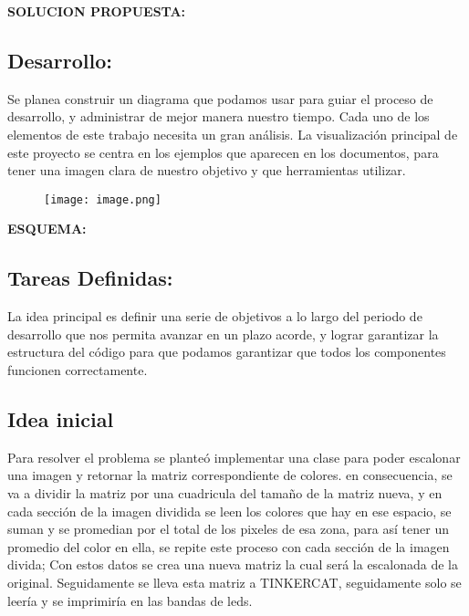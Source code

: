 \documentclass{article}
\begin{document}
\vspace{12cm}

\begin{center}
\Huge
\textbf{SOLUCION PROPUESTA: }
\end{center}
\subsection{Desarrollo:}
Se planea construir un diagrama que podamos usar para guiar el proceso de desarrollo, y administrar de mejor manera nuestro tiempo. Cada uno de los elementos de este trabajo necesita un gran análisis. La visualización principal de este proyecto se centra en los ejemplos que aparecen en los documentos, para tener una imagen clara de nuestro objetivo y que herramientas utilizar.

\vspace{1cm}

\begin{figure}[h]
\texttt{[image: image.png]}
\centering
\caption{}
\label{fig:tipos}
\end{figure}


\vspace{10cm}
\begin{center}
\Huge
\textbf{ESQUEMA: }
\end{center}

\subsection{Tareas Definidas:}
La idea principal es definir una serie de objetivos a lo largo del periodo de desarrollo que nos permita avanzar en un plazo acorde, y lograr garantizar la estructura del código para que podamos garantizar que todos los componentes funcionen correctamente.




\subsection{Idea inicial}
Para resolver el problema se planteó implementar una clase para poder escalonar una imagen y retornar la matriz correspondiente de colores. en consecuencia, se va a dividir la matriz por una cuadricula del tamaño de la matriz nueva, y en cada sección de la imagen dividida se leen los colores que hay en ese espacio, se suman y se promedian por el total de los pixeles de esa zona, para así tener un promedio del color en ella, se repite este proceso con cada sección de la imagen divida; Con estos datos se crea una nueva matriz la cual será la escalonada de la original. Seguidamente se lleva esta matriz a TINKERCAT, seguidamente solo se leería y se imprimiría en las bandas de leds.
\end{document}
